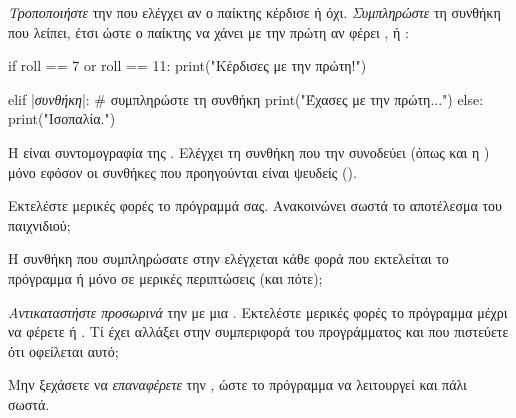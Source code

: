 \documentclass[a4paper,11pt,oneside]{book}
\begin{document}
\begin{step}
\emph{Τροποποιήστε} την  που ελέγχει αν ο παίκτης κέρδισε ή όχι. \emph{Συμπληρώστε} τη συνθήκη που λείπει, έτσι ώστε ο παίκτης να χάνει με την πρώτη αν φέρει ,  ή :

\begin{pyplain}
if roll == 7 or roll == 11:
    print("Κέρδισες με την πρώτη!")
\end{pyplain}
\begin{pynew}
elif |\textrm{\textit{συνθήκη}}|:   # συμπληρώστε τη συνθήκη
    print("Έχασες με την πρώτη...")
else:
    print("Ισοπαλία.")
\end{pynew}

Η  είναι συντομογραφία της . Ελέγχει τη συνθήκη που την συνοδεύει (όπως και η ) μόνο εφόσον οι συνθήκες που προηγούνται είναι ψευδείς ().

Εκτελέστε μερικές φορές το πρόγραμμά σας. Ανακοινώνει σωστά το αποτέλεσμα του παιχνιδιού;

\marginnote[14pt]{\icondiscuss}
\dottedline

Η συνθήκη που συμπληρώσατε στην  ελέγχεται κάθε φορά που εκτελείται το πρόγραμμα ή μόνο σε μερικές περιπτώσεις (και πότε);

\marginnote[14pt]{\icondiscuss}
\dottedline

\dottedline

\emph{Αντικαταστήστε προσωρινά} την  με μια . Εκτελέστε μερικές φορές το πρόγραμμα μέχρι να φέρετε  ή .
Τί έχει αλλάξει στην συμπεριφορά του προγράμματος και που πιστεύετε ότι οφείλεται αυτό;

\marginnote[14pt]{\icondiscuss}
\dottedline

\dottedline

\marginnote[18pt]{\iconcaution}
Μην ξεχάσετε να \emph{επαναφέρετε} την , ώστε το πρόγραμμα να λειτουργεί και πάλι σωστά.







\end{step}
\end{document}
